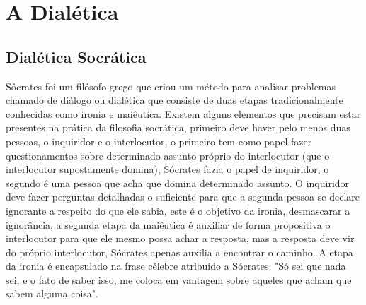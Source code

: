 \documentclass[10pt,a4paper]{report}
\begin{document}
\hspace{\baselineskip}




\section{A Dialética}

\subsection{Dialética Socrática}

% 
\hspace{\baselineskip}



Sócrates foi um filósofo grego que criou um método para analisar problemas chamado de diálogo ou dialética que consiste de duas etapas tradicionalmente conhecidas como ironia e maiêutica. Existem alguns elementos que precisam estar presentes na prática da filosofia socrática, primeiro deve haver pelo menos duas pessoas, o inquiridor e o interlocutor, o primeiro tem como papel fazer questionamentos sobre determinado assunto próprio do interlocutor (que o interlocutor supostamente domina), Sócrates fazia o papel de inquiridor, o segundo é uma pessoa que acha que domina determinado assunto. O inquiridor deve fazer perguntas detalhadas o suficiente para que a segunda pessoa se declare ignorante a respeito do que ele sabia, este é o objetivo da ironia, desmascarar a ignorância, a segunda etapa da maiêutica é auxiliar de forma propositiva o interlocutor para que ele mesmo possa achar a resposta, mas a resposta deve vir do próprio interlocutor, Sócrates apenas auxilia a encontrar o caminho. A etapa da ironia é encapsulado na frase célebre atribuído a Sócrates: "Só sei que nada sei, e o fato de saber isso, me coloca em vantagem sobre aqueles que acham que sabem alguma coisa".\\
\end{document}
